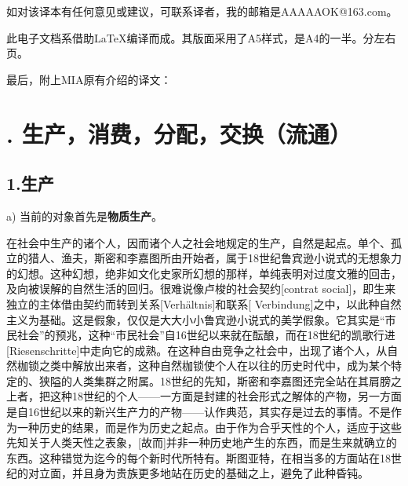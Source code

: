\documentclass[a5paper,twoside,10.5pt]{ctexart}
\begin{document}
如对该译本有任何意见或建议，可联系译者，我的邮箱是AAAAAOK@163.com。

此电子文档系借助\LaTeX 编译而成。其版面采用了A5样式，是A4的一半。分左右页。

最后，附上MIA原有介绍的译文：


\begin{adjustwidth}{2em}{2em}
\end{adjustwidth}


\newpage


\section{\uppercase\expandafter{}. 生产，消费，分配，交换（流通）}

\subsection{1.生产}

a) 当前的对象首先是\textbf{物质生产}。

在社会中生产的诸个人，因而诸个人之社会地规定的生产，自然是起点。单个、孤立的猎人、渔夫，斯密和李嘉图所由开始者，属于18世纪鲁宾逊小说式的无想象力的幻想。这种幻想，绝非如文化史家所幻想的那样，单纯表明对过度文雅的回击，及向被误解的自然生活的回归。很难说像卢梭的社会契约[contrat social]，即生来独立的主体借由契约而转到关系[Verhältnis]和联系[ Verbindung]之中，以此种自然主义为基础。这是假象，仅仅是大大小小鲁宾逊小说式的美学假象。它其实是“市民社会”的预兆，这种“市民社会”自16世纪以来就在酝酿，而在18世纪的凯歌行进[Riesenschritte]中走向它的成熟。在这种自由竞争之社会中，出现了诸个人，从自然枷锁之类中解放出来者，这种自然枷锁使个人在以往的历史时代中，成为某个特定的、狭隘的人类集群之附属。18世纪的先知，斯密和李嘉图还完全站在其肩膀之上者，把这种18世纪的个人——一方面是封建的社会形式之解体的产物，另一方面是自16世纪以来的新兴生产力的产物——认作典范，其实存是过去的事情。不是作为一种历史的结果，而是作为历史之起点。由于作为合乎天性的个人，适应于这些先知关于人类天性之表象，[故而]并非一种历史地产生的东西，而是生来就确立的东西。这种错觉为迄今的每个新时代所特有。斯图亚特，在相当多的方面站在18世纪的对立面，并且身为贵族更多地站在历史的基础之上，避免了此种昏钝。
\end{document}
